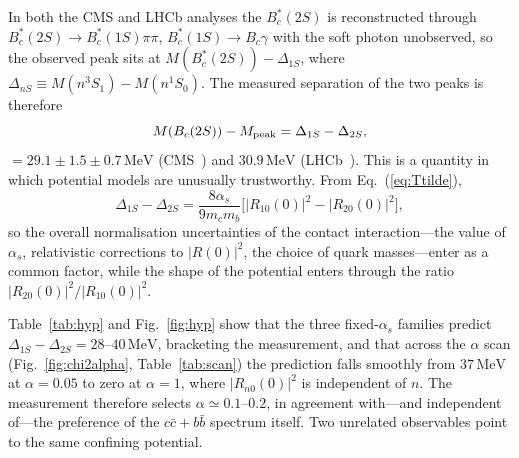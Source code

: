 \documentclass[10pt,twocolumn]{article}
\newcommand{\Bc}{B_c}
\newcommand{\Bcs}{B_c^*}
\newcommand{\cc}{c\bar c}
\newcommand{\bb}{b\bar b}
\newcommand{\MeV}{\,\mathrm{MeV}}
\begin{document}
In both the CMS and LHCb analyses the $\Bcs(2S)$ is reconstructed through $\Bcs(2S)\to\Bcs(1S)\pi\pi$, $\Bcs(1S)\to\Bc\gamma$ with the soft photon unobserved, so the observed peak sits at $M(\Bcs(2S))-\Delta_{1S}$, where $\Delta_{nS}\equiv M(n^3S_1)-M(n^1S_0)$.
The measured separation of the two peaks is therefore
\begin{equation}
  M(\Bc(2S))-M_{\rm peak} = \Delta_{1S}-\Delta_{2S},
  \label{eq:observable}
\end{equation}
$=29.1\pm1.5\pm0.7\MeV$ (CMS~\cite{CMS2019}) and $30.9\MeV$ (LHCb~\cite{LHCb2019}).
This is a quantity in which potential models are unusually trustworthy.
From Eq.~(\ref{eq:Ttilde}),
\begin{equation}
  \Delta_{1S}-\Delta_{2S}=\frac{8\alpha_s}{9m_cm_b}\big[|R_{10}(0)|^2-|R_{20}(0)|^2\big],
\end{equation}
so the overall normalisation uncertainties of the contact interaction---the value of $\alpha_s$, relativistic corrections to $|R(0)|^2$, the choice of quark masses---enter as a common factor, while the shape of the potential enters through the ratio $|R_{20}(0)|^2/|R_{10}(0)|^2$.

Table~\ref{tab:hyp} and Fig.~\ref{fig:hyp} show that the three fixed-$\alpha_s$ families predict $\Delta_{1S}-\Delta_{2S}=28$--$40\MeV$, bracketing the measurement, and that across the $\alpha$ scan (Fig.~\ref{fig:chi2alpha}, Table~\ref{tab:scan}) the prediction falls smoothly from $37\MeV$ at $\alpha=0.05$ to zero at $\alpha=1$, where $|R_{n0}(0)|^2$ is independent of $n$.
The measurement therefore selects $\alpha\simeq0.1$--$0.2$, in agreement with---and independent of---the preference of the $\cc+\bb$ spectrum itself.
Two unrelated observables point to the same confining potential.
\end{document}
